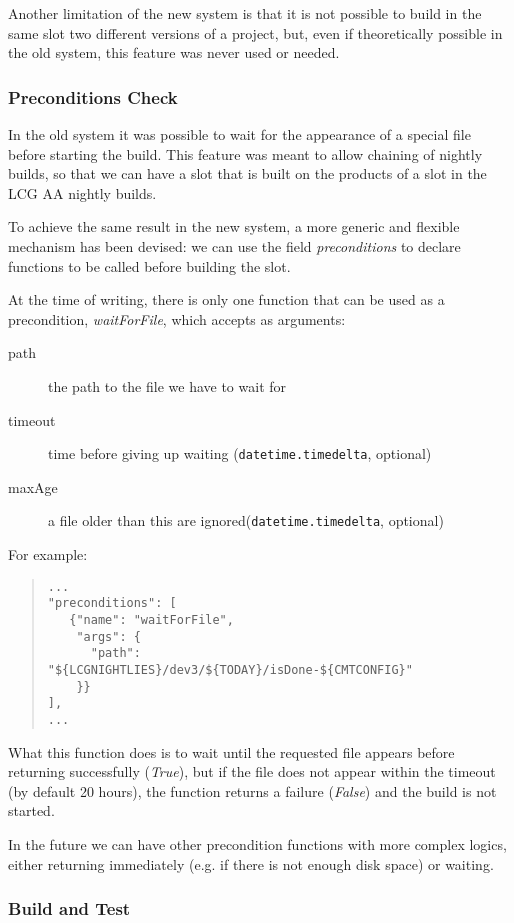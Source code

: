 \documentclass{lhcbnote}
\begin{document}
Another limitation of the new system is that it is not possible to build in the
same slot two different versions of a project, but, even if theoretically
possible in the old system, this feature was never used or needed.

\subsubsection{Preconditions Check}
In the old system it was possible to wait for the appearance of a special file
before starting the build.  This feature was meant to allow chaining of nightly
builds, so that we can have a slot that is built on the products of a slot in
the LCG AA nightly builds.

To achieve the same result in the new system, a more generic and flexible
mechanism has been devised: we can use the field \emph{preconditions} to declare
functions to be called before building the slot.

At the time of writing, there is only one function that can be used as a
precondition, \emph{waitForFile}, which accepts as arguments:
\begin{description}
  \item[path] the path to the file we have to wait for
  \item[timeout] time before giving up waiting (\texttt{datetime.timedelta},
  optional)
  \item[maxAge] a file older than this are ignored(\texttt{datetime.timedelta},
  optional)
\end{description}
For example:
\begin{quote}
\begin{verbatim}
...
"preconditions": [
   {"name": "waitForFile",
    "args": {
      "path": "${LCGNIGHTLIES}/dev3/${TODAY}/isDone-${CMTCONFIG}"
    }}
],
...
\end{verbatim}
\end{quote}
What this function does is to wait until the requested file appears before
returning successfully (\emph{True}), but if the file does not appear within the
timeout (by default 20 hours), the function returns a failure (\emph{False}) and
the build is not started.

In the future we can have other precondition functions with more complex logics,
either returning immediately (e.g. if there is not enough disk space) or
waiting.

\subsubsection{Build and Test}
\end{document}
